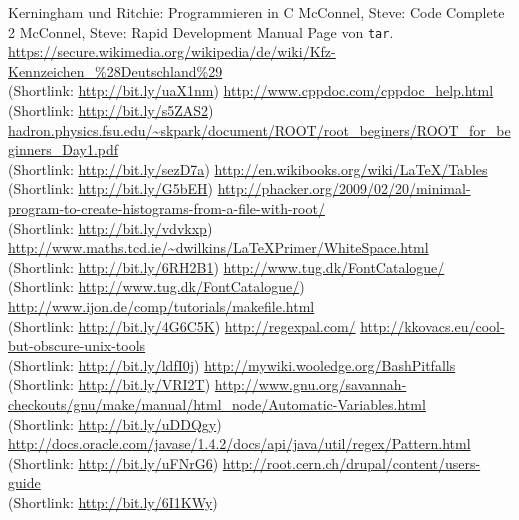 \documentclass[12pt]{report}
\newcommand\gqq[1]{\glqq #1\grqq}
\begin{document}
\begin{thebibliography}{n}
 Kerningham und Ritchie: \gqq{Programmieren in C}
 McConnel, Steve: \gqq{Code Complete 2}
 McConnel, Steve: \gqq{Rapid Development}
 Manual Page von \texttt{tar}.
 \url{https://secure.wikimedia.org/wikipedia/de/wiki/Kfz-Kennzeichen_\%28Deutschland\%29} \\ (Shortlink: \url{http://bit.ly/uaX1nm})
 \url{http://www.cppdoc.com/cppdoc_help.html} \\ (Shortlink: \url{http://bit.ly/s5ZAS2})
 \url{hadron.physics.fsu.edu/~skpark/document/ROOT/root_beginers/ROOT_for_beginners_Day1.pdf} \\ (Shortlink: \url{http://bit.ly/sezD7a})
 \url{http://en.wikibooks.org/wiki/LaTeX/Tables} \\ (Shortlink: \url{http://bit.ly/G5bEH})
 \url{http://phacker.org/2009/02/20/minimal-program-to-create-histograms-from-a-file-with-root/} \\ (Shortlink: \url{http://bit.ly/vdvkxp})
 \url{http://www.maths.tcd.ie/~dwilkins/LaTeXPrimer/WhiteSpace.html} \\ (Shortlink: \url{http://bit.ly/6RH2B1})
 \url{http://www.tug.dk/FontCatalogue/} \\ (Shortlink: \url{http://www.tug.dk/FontCatalogue/})
 \url{http://www.ijon.de/comp/tutorials/makefile.html} \\ (Shortlink: \url{http://bit.ly/4G6C5K})
 \url{http://regexpal.com/}
 \url{http://kkovacs.eu/cool-but-obscure-unix-tools} \\ (Shortlink: \url{http://bit.ly/ldfI0j})
 \url{http://mywiki.wooledge.org/BashPitfalls} \\ (Shortlink: \url{http://bit.ly/VRI2T})
 \url{http://www.gnu.org/savannah-checkouts/gnu/make/manual/html_node/Automatic-Variables.html} \\ (Shortlink: \url{http://bit.ly/uDDQgy})
 \url{http://docs.oracle.com/javase/1.4.2/docs/api/java/util/regex/Pattern.html} \\ (Shortlink: \url{http://bit.ly/uFNrG6})
 \url{http://root.cern.ch/drupal/content/users-guide} \\ (Shortlink: \url{http://bit.ly/6I1KWy})
\end{thebibliography}
\end{document}
